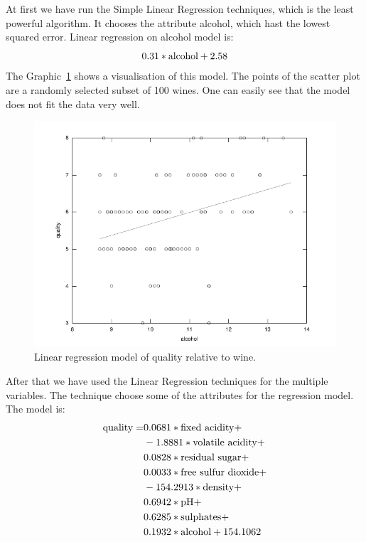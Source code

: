 \documentclass[a4paper]{article}
\begin{document}
At first we have run the Simple Linear Regression techniques, which is the least powerful algorithm. It chooses the attribute alcohol, which hast the lowest squared error. Linear regression on alcohol model is: 
\begin{equation*}
    0.31 * \textnormal{alcohol} + 2.58
\end{equation*}
The Graphic~\ref{pic:linreg1} shows a visualisation of this model. The points of the scatter plot are a randomly selected subset of 100 wines. One can easily see that the model does not fit the data very well.
\begin{figure}[t]
    \centering
    \includegraphics{wine}
    \caption{Linear regression model of quality relative to wine.\label{pic:linreg1}}
\end{figure}

After that we have used the Linear Regression techniques for the multiple variables. The technique choose some of the attributes for the regression model. The model is:
\begin{align*}
    \textnormal{quality} = &0.0681 * \textnormal{fixed acidity} +\\
                           &-1.8881 * \textnormal{volatile acidity} +\\
                           & 0.0828 * \textnormal{residual sugar} +\\
                           & 0.0033 * \textnormal{free sulfur dioxide} +\\
                           &-154.2913 * \textnormal{density} +\\
                           &0.6942 * \textnormal{pH} +\\
                           &0.6285 * \textnormal{sulphates} +\\
                           &0.1932 * \textnormal{alcohol} + 154.1062\\
\end{align*}
\end{document}
